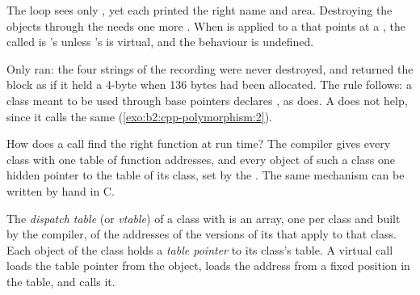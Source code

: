 \label{out:b2:cpp-polymorphism:shapes}

The loop sees only , yet each  printed the right name and area. Destroying the
objects through the  needs one more . When  is applied to a  that
points at a , the  called is 's unless 's  is virtual, and the behaviour
is undefined.

\label{lst:b2:cpp-polymorphism:no-virtual-dtor}

\label{out:b2:cpp-polymorphism:no-virtual-dtor}

Only  ran: the four strings of the recording were never destroyed, and  returned the block
as if it held a 4-byte  when 136 bytes had been allocated. The rule follows: a class meant to be used
through base pointers declares , as  does. A  does
not help, since it calls the same  (\cref{exo:b2:cpp-polymorphism:2}).

How does a call find the right function at run time? The compiler gives every class with  one
table of function addresses, and every object of such a class one hidden pointer to the table of its class, set by
the . The same mechanism can be written by hand in C.

\begin{definition}\label{def:b2:cpp-polymorphism:vtable}
The \emph{dispatch table} (or \emph{vtable}) of a class with  is
an array, one per class and built by the compiler, of the addresses of the versions of its  that
apply to that class. Each object of the class holds a \emph{table pointer} to its class's table.
A virtual call loads the table pointer from the object, loads the address from a fixed position in the table, and
calls it.
\end{definition}

